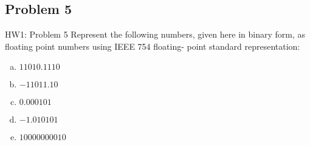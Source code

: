 \documentclass{../slides}
\begin{document}
\subsection{Problem 5}
\begin{frame}{HW1: Problem 5}
    Represent the following numbers, given here in binary form, as floating point numbers using IEEE 754 floating- point standard representation:
    \begin{enumerate}[(a)]
        \item $11010.1110$
        \item $-11011.10$
        \item $0.000101$
        \item $-1.010101$
        \item $10000000010$
    \end{enumerate}
\end{frame}
\end{document}
